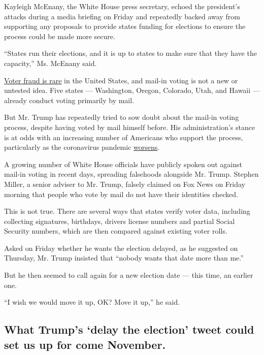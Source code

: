 Kayleigh McEnany, the White House press secretary, echoed the
president's attacks during a media briefing on Friday and repeatedly
backed away from supporting any proposals to provide states funding for
elections to ensure the process could be made more secure.

``States run their elections, and it is up to states to make sure that
they have the capacity,'' Ms. McEnany said.

\href{https://www.nytimes.com/article/mail-in-voting-explained.html}{Voter
fraud is rare} in the United States, and mail-in voting is not a new or
untested idea. Five states --- Washington, Oregon, Colorado, Utah, and
Hawaii --- already conduct voting primarily by mail.

But Mr. Trump has repeatedly tried to sow doubt about the mail-in voting
process, despite having voted by mail himself before. His
administration's stance is at odds with an increasing number of
Americans who support the process, particularly as the coronavirus
pandemic
\href{https://www.nytimes.com/2020/07/31/us/politics/trump-mail-voting-fraud.html}{worsens}.

A growing number of White House officials have publicly spoken out
against mail-in voting in recent days, spreading falsehoods alongside
Mr. Trump. Stephen Miller, a senior adviser to Mr. Trump, falsely
claimed on Fox News on Friday morning that people who vote by mail do
not have their identities checked.

This is not true. There are several ways that states verify voter data,
including collecting signatures, birthdays, drivers license numbers and
partial Social Security numbers, which are then compared against
existing voter rolls.

Asked on Friday whether he wants the election delayed, as he suggested
on Thursday, Mr. Trump insisted that ``nobody wants that date more than
me.''

But he then seemed to call again for a new election date --- this time,
an earlier one.

``I wish we would move it up, OK? Move it up,'' he said.

\hypertarget{what-trumps-delay-the-election-tweet-could-set-us-up-for-come-november}{%
\subsection{What Trump's `delay the election' tweet could set us up for
come
November.}\label{what-trumps-delay-the-election-tweet-could-set-us-up-for-come-november}}

